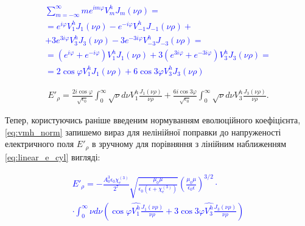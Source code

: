 \textcolor{blue} { \begin{equation*} \begin{aligned}
\sum_{m=-\infty}^\infty m e^{im \varphi} V_m^h J_m(\nu \rho) = \\ =
  e^{  i \varphi} V_{ 1}^h J_{ 1}(\nu \rho) - 
  e^{- i \varphi} V_{-1}^h J_{-1}(\nu \rho) + \\ +
3 e^{ 3i \varphi} V_{ 3}^h J_{ 3}(\nu \rho) - 
3 e^{-3i \varphi} V_{-3}^h J_{-3}(\nu \rho) = \\ =
\left( e^{ i\varphi} + e^{- i\varphi} \right) V_1^h J_1(\nu \rho) + 
3 \left( e^{3i\varphi} + e^{-3i\varphi} \right) V_3^h J_3(\nu \rho) = \\
= 2 \cos \varphi V_1^h J_1(\nu \rho) + 
6 \cos 3 \varphi V_3^h J_3(\nu \rho)
\end{aligned} \end{equation*} }

\begin{equation} \begin{aligned}
E'_\rho = \frac{2 i \cos \varphi}{\sqrt{\epsilon_0}}
\int_0^\infty \sqrt{\nu} d \nu V_1^h \frac{J_1(\nu \rho)}{\nu \rho} +
\frac{6 i \cos 3 \varphi}{\sqrt{\epsilon_0}}
\int_0^\infty \sqrt{\nu} d \nu V_3^h \frac{J_3(\nu \rho)}{\nu \rho}.
\end{aligned} \end{equation}

Тепер, користуючись раніше введеним нормуванням еволюційного коефіцієнта, 
\eqref{eq:vmh_norm} запишемо вираз для нелінійної поправки до напруженості 
електричного поля $ E'_\rho $ в зручному для порівняння з лінійним наближенням
\eqref{eq:linear_e_cyl} вигляді:

\textcolor{blue} { \begin{equation*} \begin{aligned}
E'_\rho = - \frac{A_0^3 \epsilon_0 \chi_e^{(3)}}{2^7}
\sqrt{\frac{\mu_0 \mu}{\epsilon_0 \left( \epsilon + \chi_e^{(3)} \right)}} 
\left( \frac{\mu_0 \mu}{\epsilon_0 \epsilon} \right)^{3/2} \cdot \\
\cdot \int_0^\infty \nu d \nu \left(
\cos \varphi \hat{V_1^h} \frac{J_1(\nu \rho)}{\nu \rho} +
3 \cos 3\varphi \hat{V_3^h} \frac{J_3(\nu \rho)}{\nu \rho} 
\right)
\end{aligned} \end{equation*} }

